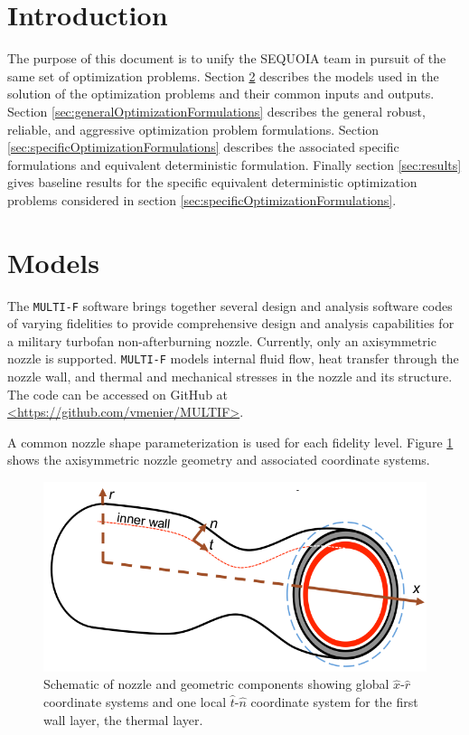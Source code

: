\documentclass{article}
\begin{document}
\section{Introduction}

The purpose of this document is to unify the SEQUOIA team in pursuit of the same set of optimization problems. Section \ref{sec:models} describes the models used in the solution of the optimization problems and their common inputs and outputs. Section \ref{sec:generalOptimizationFormulations} describes the general robust, reliable, and aggressive optimization problem formulations.  Section \ref{sec:specificOptimizationFormulations} describes the associated specific formulations and equivalent deterministic formulation. Finally section \ref{sec:results} gives baseline results for the specific equivalent deterministic optimization problems considered in section \ref{sec:specificOptimizationFormulations}.

\section{Models} \label{sec:models}

The \texttt{MULTI-F} software brings together several design and analysis software codes of varying fidelities to provide comprehensive design and analysis capabilities for a military turbofan non-afterburning nozzle. Currently, only an axisymmetric nozzle is supported. \texttt{MULTI-F} models internal fluid flow, heat transfer through the nozzle wall, and thermal and mechanical stresses in the nozzle and its structure. The code can be accessed on GitHub at \url{<https://github.com/vmenier/MULTIF>}.

A common nozzle shape parameterization is used for each fidelity level. Figure \ref{fig:nozzleSchematic} shows the axisymmetric nozzle geometry and associated coordinate systems.

\begin{figure}
\caption{Schematic of nozzle and geometric components showing global $\hat{x}$-$\hat{r}$ coordinate systems and one local $\hat{t}$-$\hat{n}$ coordinate system for the first wall layer, the thermal layer.}
\label{fig:nozzleSchematic}
\begin{center}
\includegraphics[scale=0.5]{figs/nozzle_schematic.png}
\end{center}
\end{figure}
\end{document}
